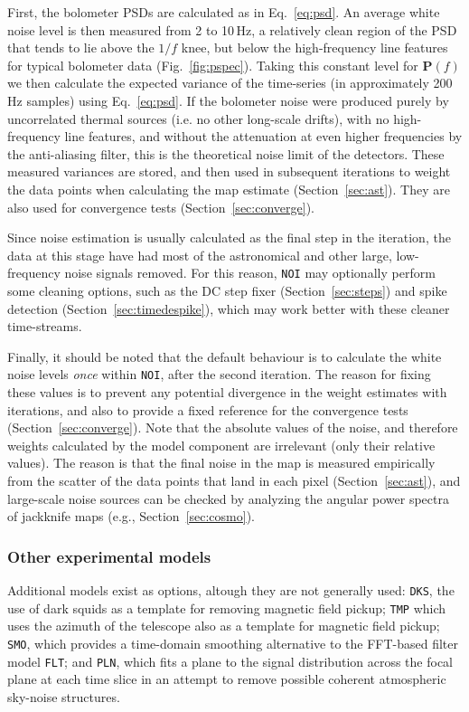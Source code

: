 \documentclass[useAMS,usenatbib,nofootinbib]{mn2e}
\newcommand{\model}[1]{\texttt{#1}}
\begin{document}
First, the bolometer PSDs are calculated as in Eq.~\ref{eq:psd}. An
average white noise level is then measured from 2 to 10\,Hz, a
relatively clean region of the PSD that tends to lie above the $1/f$
knee, but below the high-frequency line features for typical bolometer
data (Fig.~\ref{fig:pspec}). Taking this constant level for
$\mathbf{P}(f)$ we then calculate the expected variance of the
time-series (in approximately 200\,Hz samples) using
Eq.~\ref{eq:psd}. If the bolometer noise were produced purely by
uncorrelated thermal sources (i.e. no other long-scale drifts), with
no high-frequency line features, and without the attenuation at even
higher frequencies by the anti-aliasing filter, this is the
theoretical noise limit of the detectors. These measured variances are
stored, and then used in subsequent iterations to weight the data
points when calculating the map estimate (Section~\ref{sec:ast}). They
are also used for convergence tests (Section~\ref{sec:converge}).

Since noise estimation is usually calculated as the final step in the
iteration, the data at this stage have had most of the astronomical
and other large, low-frequency noise signals removed. For this reason,
\model{NOI} may optionally perform some cleaning options, such as the
DC step fixer (Section~\ref{sec:steps}) and spike detection
(Section~\ref{sec:timedespike}), which may work better with these
cleaner time-streams.

Finally, it should be noted that the default behaviour is to calculate
the white noise levels \emph{once} within \model{NOI}, after the second
iteration. The reason for fixing these values is to prevent any
potential divergence in the weight estimates with iterations, and also
to provide a fixed reference for the convergence tests
(Section~\ref{sec:converge}). Note that the absolute values of the
noise, and therefore weights calculated by the model component are
irrelevant (only their relative values). The reason is that the final
noise in the map is measured empirically from the scatter of the data
points that land in each pixel (Section~\ref{sec:ast}), and
large-scale noise sources can be checked by analyzing the angular
power spectra of jackknife maps (e.g., Section~\ref{sec:cosmo}).

\subsubsection{Other experimental models}

Additional models exist as options, altough they are not generally
used: \model{DKS}, the use of dark squids as a template for removing
magnetic field pickup; \model{TMP} which uses the azimuth of the
telescope also as a template for magnetic field pickup; \model{SMO},
which provides a time-domain smoothing alternative to the FFT-based
filter model \model{FLT}; and \model{PLN}, which fits a plane to the
signal distribution across the focal plane at each time slice in an
attempt to remove possible coherent atmospheric sky-noise structures.
\end{document}
